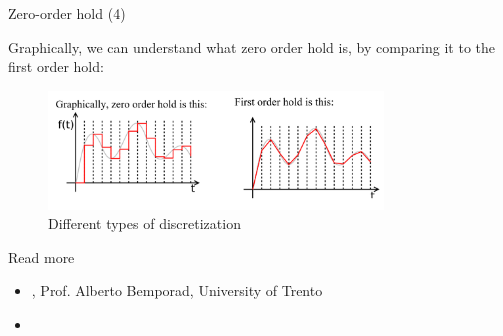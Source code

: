 \documentclass{beamer}
\begin{document}
\begin{frame}{Zero-order hold (4)}
\begin{flushleft}

Graphically, we can understand what zero order hold is, by comparing it to the first order hold:

\begin{figure} [h!]
\begin{center}
\includegraphics[width=3.5in]{ZOH.PNG}
\end{center} 
\caption{Different types of discretization} \label{F:ZOH}
\end{figure}

\end{flushleft}
\end{frame}


%
%
%
%
%
%









\begin{frame}{Read more}

\begin{itemize}
\item  {}, Prof. Alberto Bemporad, University of Trento

\item {}

\end{itemize}

\end{frame}
\end{document}
